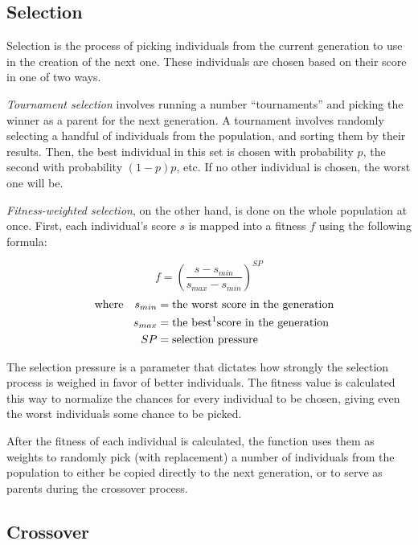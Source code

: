 \documentclass{report}
\begin{document}
\subsection{Selection}

Selection is the process of picking individuals from the current generation to use in the creation of the next one. These individuals are chosen based on their score in one of two ways.

\emph{Tournament selection} involves running a number ``tournaments'' and picking the winner as a parent for the next generation. A tournament involves randomly selecting a handful of individuals from the population, and sorting them by their results. Then, the best individual in this set is chosen with probability \label{tournament_p}$p$, the second with probability $(1-p)p$, etc. If no other individual is chosen, the worst one will be.

\emph{Fitness-weighted selection}, on the other hand, is done on the whole population at once. First, each individual's score $s$ is mapped into a fitness $f$ using the following formula:

$$f = \left(\frac{s - s_{min}}{s_{max} - s_{min}}\right)^{SP}$$
\begin{align*}\quad
    \text{where}\quad
    s_{min} &= \text{the worst score in the generation}\\
    s_{max} &= \text{the best\footnotemark score in the generation}\\
    SP &= \text{selection pressure}
\end{align*}


The selection pressure is a parameter that dictates how strongly the selection process is weighed in favor of better individuals. The fitness value is calculated this way to normalize the chances for every individual to be chosen, giving even the worst individuals some chance to be picked.

After the fitness of each individual is calculated, the function uses them as weights to randomly pick (with replacement) a number of individuals from the population to either be copied directly to the next generation, or to serve as parents during the crossover process.

\subsection{Crossover}
\end{document}
